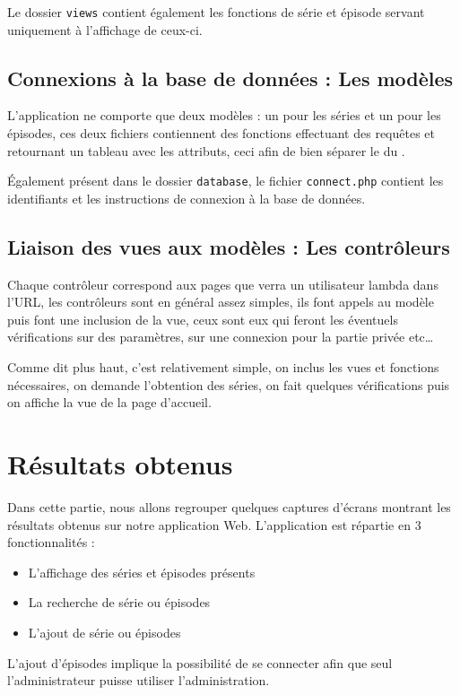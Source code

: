 \documentclass[12pt,a4paper,openany]{book}
\begin{document}
		Le dossier \texttt{views} contient également les fonctions de série et épisode servant uniquement à l'affichage de ceux-ci.
			
		\section{Connexions à la base de données : Les modèles}
		L'application ne comporte que deux modèles : un pour les séries et un pour les épisodes, ces deux fichiers contiennent des fonctions effectuant des
		requêtes et retournant un tableau avec les attributs, ceci afin de bien séparer le  du .

		Également présent dans le dossier \texttt{database}, le fichier \texttt{connect.php} contient les identifiants et les instructions de connexion à la base de données.

		
		
		\section{Liaison des vues aux modèles : Les contrôleurs}
		Chaque contrôleur correspond aux pages que verra un utilisateur lambda dans l'URL, les contrôleurs sont en général assez simples, ils font appels au
		modèle puis font une inclusion de la vue, ceux sont eux qui feront les éventuels vérifications sur des paramètres, sur une connexion pour la partie
		privée etc\ldots
		
		Comme dit plus haut, c'est relativement simple, on inclus les vues et fonctions nécessaires, on demande l'obtention des séries, on fait quelques
		vérifications puis on affiche la vue de la page d'accueil.
	\chapter{Résultats obtenus}
	Dans cette partie, nous allons regrouper quelques captures d'écrans montrant les résultats obtenus sur notre application Web. L'application est répartie en 3
	fonctionnalités : 
	\begin{itemize}
		\item L'affichage des séries et épisodes présents
		\item La recherche de série ou épisodes
		\item L'ajout de série ou épisodes
	\end{itemize}
	L'ajout d'épisodes implique la possibilité de se connecter afin que seul l'administrateur puisse utiliser l'administration.
\end{document}
